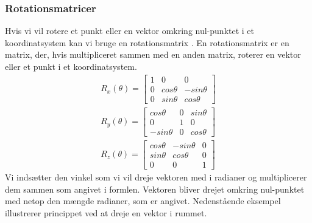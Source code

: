 \subsubsection{Rotationsmatricer}
\label{sec:rot_matricer}
Hvis vi vil rotere et punkt eller en vektor omkring nul-punktet i et koordinatsystem kan vi bruge en rotationsmatrix \cite{rotationsmatricer}.
En rotationsmatrix er en matrix, der, hvis multipliceret sammen med en anden matrix, roterer en vektor eller et punkt i et koordinatsystem.
\begin{align}\label{eu_eqn}
  R_x(\theta) = 
  \begin{bmatrix}
    1 & 0 & 0\\ 
    0 & cos \theta & - sin \theta\\ 
    0 & sin \theta & cos \theta
  \end{bmatrix}\\
    R_y(\theta) =
  \begin{bmatrix}
    cos \theta  & 0 & sin \theta\\ 
    0           & 1 & 0\\ 
    -sin \theta & 0 & cos \theta
  \end{bmatrix}\\
    R_z(\theta) = 
  \begin{bmatrix}
    cos \theta & - sin \theta & 0\\ 
    sin \theta & cos \theta & 0\\
    0 & 0 & 1
  \end{bmatrix}
\end{align}
Vi indsætter den vinkel som vi vil dreje vektoren med i radianer og multiplicerer dem sammen som angivet i formlen. Vektoren bliver drejet omkring nul-punktet med netop den mængde radianer, som er angivet.
Nedenstående eksempel illustrerer princippet ved at dreje en vektor i rummet.

